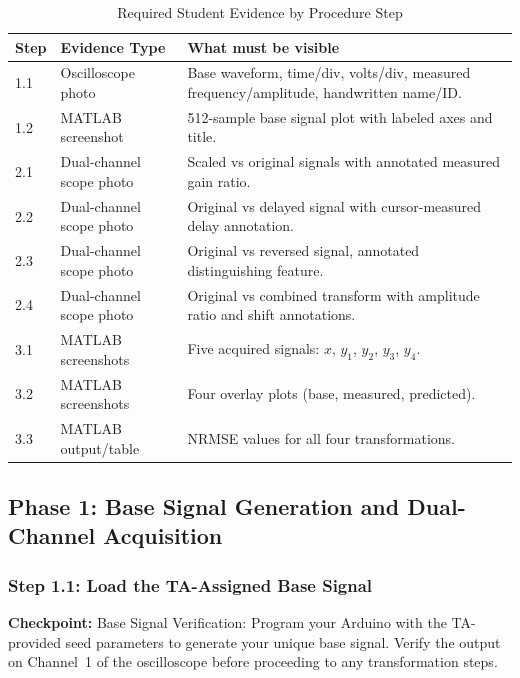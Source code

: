 \documentclass[11pt,letterpaper]{article}
\providecommand{\cpECE}[1]{\textcolor{OliveGreen}{\textbf{Checkpoint:} #1}}
\begin{document}
\begin{table}[H]
    \centering
    \caption{Required Student Evidence by Procedure Step}
    \begin{tabularx}{\linewidth}{l l X}
    \toprule
    \textbf{Step} & \textbf{Evidence Type} & \textbf{What must be visible}\\
    \midrule
    1.1 & Oscilloscope photo & Base waveform, time/div, volts/div, measured frequency/amplitude, handwritten name/ID.\\
    1.2 & MATLAB screenshot & 512-sample base signal plot with labeled axes and title.\\
    2.1 & Dual-channel scope photo & Scaled vs original signals with annotated measured gain ratio.\\
    2.2 & Dual-channel scope photo & Original vs delayed signal with cursor-measured delay annotation.\\
    2.3 & Dual-channel scope photo & Original vs reversed signal, annotated distinguishing feature.\\
    2.4 & Dual-channel scope photo & Original vs combined transform with amplitude ratio and shift annotations.\\
    3.1 & MATLAB screenshots & Five acquired signals: $x$, $y_1$, $y_2$, $y_3$, $y_4$.\\
    3.2 & MATLAB screenshots & Four overlay plots (base, measured, predicted).\\
    3.3 & MATLAB output/table & NRMSE values for all four transformations.\\
    \bottomrule
    \end{tabularx}
\end{table}

\subsection{Phase 1: Base Signal Generation and Dual-Channel Acquisition}

\subsubsection{Step 1.1: Load the TA-Assigned Base Signal}
\cpECE{Base Signal Verification:} Program your Arduino with the TA-provided seed parameters to generate your unique base signal. Verify the output on Channel~1 of the oscilloscope before proceeding to any transformation steps.
\end{document}
